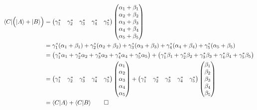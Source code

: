 \documentclass[solutions.tex]{subfiles}
\begin{document}
\begin{align*}
\langle C| \Big( |A\rangle + |B\rangle \Big) &=
\begin{pmatrix}
\gamma_1^* & \gamma_2^* & \gamma_3^* & \gamma_4^* & \gamma_5^* \\
\end{pmatrix}
\begin{pmatrix}
\alpha_1 + \beta_1 \\
\alpha_2 + \beta_2 \\
\alpha_3 + \beta_3 \\
\alpha_4 + \beta_4 \\
\alpha_5 + \beta_5 \\
\end{pmatrix}
\\
~ &= \gamma_1^*(\alpha_1+\beta_1) + \gamma_2^*(\alpha_2+\beta_2) +
\gamma_3^*(\alpha_3+\beta_3) + \gamma_4^*(\alpha_4+\beta_4) +
\gamma_5^*(\alpha_5+\beta_5) \\
~ &= \big(\gamma_1^*\alpha_1 + \gamma_2^*\alpha_2 + \gamma_3^*\alpha_3 +
\gamma_4^*\alpha_4 + \gamma_5^*\alpha_5 \big) +
\big(\gamma_1^*\beta_1 + \gamma_2^*\beta_2 + \gamma_3^*\beta_3 +
\gamma_4^*\beta_4 + \gamma_5^*\beta_5 \big) \\
~ &=
\begin{pmatrix}
	\gamma_1^* & \gamma_2^* & \gamma_3^* & \gamma_4^* & \gamma_5^* \\
\end{pmatrix}
\begin{pmatrix}
	\alpha_1 \\
	\alpha_2 \\
	\alpha_3 \\
	\alpha_4 \\
	\alpha_5 \\
\end{pmatrix} +
\begin{pmatrix}
	\gamma_1^* & \gamma_2^* & \gamma_3^* & \gamma_4^* & \gamma_5^* \\
\end{pmatrix}
\begin{pmatrix}
	\beta_1 \\
	\beta_2 \\
	\beta_3 \\
	\beta_4 \\
	\beta_5 \\
\end{pmatrix} \\
~ &= \left\langle C \middle| A \right\rangle + \left\langle C \middle| B \right\rangle \qed
\end{align*}
\end{document}
